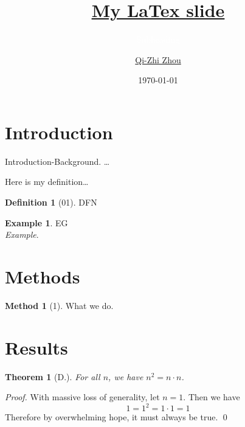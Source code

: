 \documentclass{beamer}	%
\title{\textcolor{white}{\href{https://github.com/Veenxz}{My LaTex slide}}}
\subtitle{\textcolor{white}{Subheading}}
\author{\href {mailto:zhouqizhi@bjfu.edu.cn}{Qi-Zhi Zhou}}
\date{\today}
\newcommand{\pf}{\noindent\emph{Proof. }}
\theoremstyle{plain}
\newtheorem{thm}{Theorem}[section]
\theoremstyle{definition}
\newtheorem{ex}{Example}[section]
\newtheorem{dfn}{Definition}[section]
\newtheorem{met}{Method}[section]
\theoremstyle{remark}
\numberwithin{equation}{section}
\begin{document}
\begin{frame}
\titlepage
\end{frame}



\section{Introduction}



\begin{frame}
Introduction-Background. \dots
\end{frame}



\begin{frame}
Here is my definition\dots

\begin{dfn}[01]
DFN
\end{dfn}

\begin{ex}
EG\\
\emph{Example}.
\end{ex}
\end{frame}



\section{Methods}



\begin{frame}
\begin{met}[1]
What we do.
\end{met}
\end{frame}



\section{Results}



\begin{frame}
\begin{thm}[D.]
For all $n$, we have $n^2= n \cdot n$.
\end{thm}

\pf With massive loss of generality, let $n=1$. Then we have
	\[
	1=1^2= 1 \cdot 1= 1
	\]
Therefore by overwhelming hope, it must always be true. \qed
\end{frame}
\end{document}

